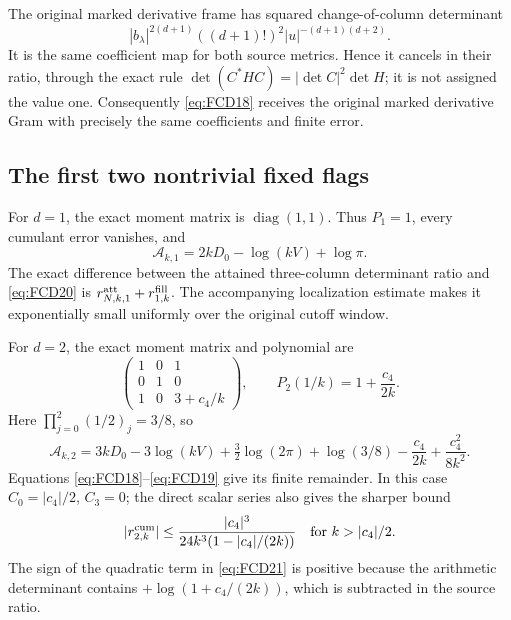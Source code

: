 The original marked derivative frame has squared change-of-column
determinant
\[
 |b_\lambda|^{2(d+1)}((d+1)!)^2
                  |u|^{-(d+1)(d+2)} .
\]
It is the same coefficient map for both source metrics. Hence it cancels
in their ratio, through the exact rule
\(\det(C^*HC)=|\det C|^2\det H\); it is not assigned the value one.
Consequently \eqref{eq:FCD18} receives the original marked derivative
Gram with precisely the same coefficients and finite error.

\subsection{The first two nontrivial fixed flags}

For \(d=1\), the exact moment matrix is \(\operatorname{diag}(1,1)\).
Thus \(P_1=1\), every cumulant error vanishes, and
\begin{equation}
 \mathcal A_{k,1}=2kD_0-\log(kV)+\log\pi .
 \tag{FCD20}\label{eq:FCD20}
\end{equation}
The exact difference between the attained three-column determinant
ratio and \eqref{eq:FCD20} is
\(r_{N,k,1}^{\rm att}+r_{1,k}^{\rm fill}\).
The accompanying localization estimate makes it exponentially small
uniformly over the original cutoff window.

For \(d=2\), the exact moment matrix and polynomial are
\[
 \begin{pmatrix}
 1&0&1\\
 0&1&0\\
 1&0&3+c_4/k
 \end{pmatrix},
 \qquad P_2(1/k)=1+\frac{c_4}{2k}.
\]
Here \(\prod_{j=0}^2(1/2)_j=3/8\), so
\begin{equation}
 \mathcal A_{k,2}
 =3kD_0-3\log(kV)+\tfrac32\log(2\pi)+\log(3/8)
                 -\frac{c_4}{2k}+\frac{c_4^2}{8k^2}.
 \tag{FCD21}\label{eq:FCD21}
\end{equation}
Equations \eqref{eq:FCD18}--\eqref{eq:FCD19} give its finite remainder.
In this case \(C_0=|c_4|/2\), \(C_3=0\); the direct scalar series also
gives the sharper bound
\[
 |r_{2,k}^{\rm cum}|
    \le\frac{|c_4|^3}{24k^3(1-|c_4|/(2k))}
       \quad\text{for }k>|c_4|/2 .
\]
The sign of the quadratic term in \eqref{eq:FCD21} is positive because
the arithmetic determinant contains \(+\log(1+c_4/(2k))\), which is
subtracted in the source ratio.

